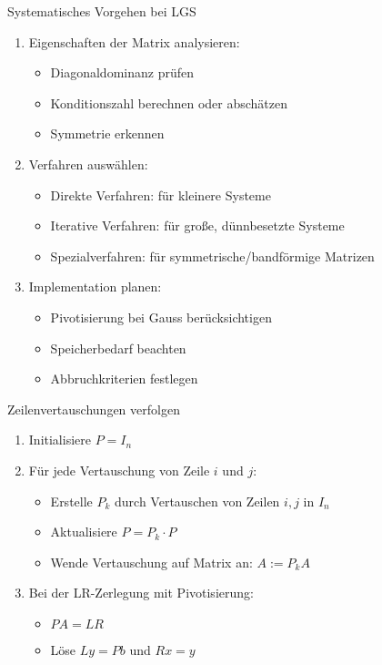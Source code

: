 \begin{KR}{Systematisches Vorgehen bei LGS}
\begin{enumerate}
    \item Eigenschaften der Matrix analysieren:
    \begin{itemize}
        \item Diagonaldominanz prüfen
        \item Konditionszahl berechnen oder abschätzen
        \item Symmetrie erkennen
    \end{itemize}
    
    \item Verfahren auswählen:
    \begin{itemize}
        \item Direkte Verfahren: für kleinere Systeme
        \item Iterative Verfahren: für große, dünnbesetzte Systeme
        \item Spezialverfahren: für symmetrische/bandförmige Matrizen
    \end{itemize}
    
    \item Implementation planen:
    \begin{itemize}
        \item Pivotisierung bei Gauss berücksichtigen
        \item Speicherbedarf beachten
        \item Abbruchkriterien festlegen
    \end{itemize}
\end{enumerate}
\end{KR}

\begin{KR}{Zeilenvertauschungen verfolgen}
\begin{enumerate}
    \item Initialisiere $P = I_n$
    \item Für jede Vertauschung von Zeile $i$ und $j$:
    \begin{itemize}
        \item Erstelle $P_k$ durch Vertauschen von Zeilen $i,j$ in $I_n$
        \item Aktualisiere $P = P_k \cdot P$
        \item Wende Vertauschung auf Matrix an: $A := P_kA$
    \end{itemize}
    \item Bei der LR-Zerlegung mit Pivotisierung:
    \begin{itemize}
        \item $PA = LR$ 
        \item Löse $Ly = Pb$ und $Rx = y$
    \end{itemize}
\end{enumerate}
\end{KR}















